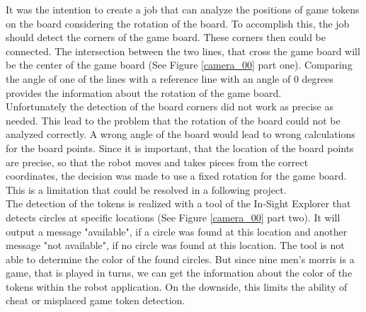 \documentclass[a4paper]{spie}  %
\begin{document}
\begin{large}
It was the intention to create a job that can analyze the positions of game tokens on the board considering the rotation of the board. To accomplish this, the job should detect the corners of the game board. These corners then could be connected. The intersection between the two lines, that cross the game board will be the center of the game board (See Figure \ref{camera_00} part one). Comparing the angle of one of the lines with a reference line with an angle of 0 degrees provides the information about the rotation of the game board.\\ Unfortunately the detection of the board corners did not work as precise as needed. This lead to the problem that the rotation of the board could not be analyzed correctly. A wrong angle of the board would lead to wrong calculations for the board points. Since it is important, that the location of the board points are precise, so that the robot moves and takes pieces from the correct coordinates, the decision was made to use a fixed rotation for the game board. This is a limitation that could be resolved in a following project.\\
The detection of the tokens is realized with a tool of the In-Sight Explorer that detects circles at specific locations (See Figure \ref{camera_00} part two). It will output a message "available", if a circle was found at this location and another message "not available", if no circle was found at this location. The tool is not able to determine the color of the found circles. But since nine men's  morris is a game, that is played in turns, we can get the information about the color of the tokens within the robot application. On the downside, this limits the ability of cheat or misplaced game token detection.



\end{large}
\end{document}
